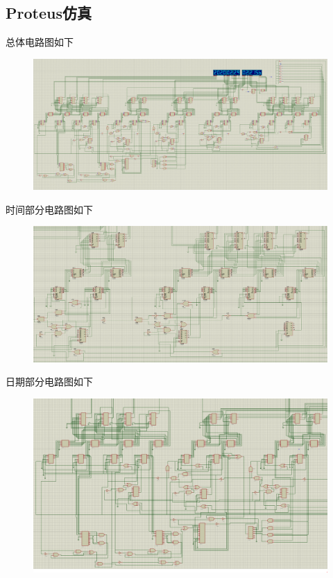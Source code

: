 \documentclass[11pt,UTF8]{ctexart}
\begin{document}
\subsection{Proteus仿真}
\par 总体电路图如下
\begin{figure}[H]
    \centering
    \includegraphics[width=\linewidth]{fig/Counter_4.PNG}
\end{figure}
\par 时间部分电路图如下
\begin{figure}[H]
    \centering
    \includegraphics[width=\linewidth]{fig/Counter_3_time.PNG}
\end{figure}
\par 日期部分电路图如下
\begin{figure}[H]
    \centering
    \includegraphics[width=\linewidth]{fig/Counter_4_date.PNG}
\end{figure}
\end{document}
